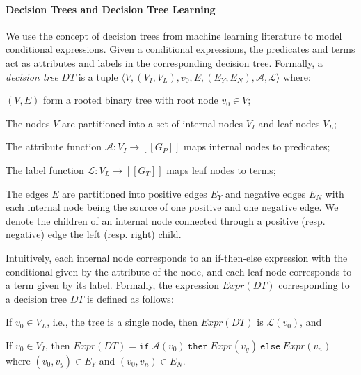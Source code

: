 \documentclass{llncs}
\newcommand\tuple[1]{\langle #1 \rangle}
\newcommand\Grammar{G}
\newcommand\sem[1]{[\![ #1 ]\!]}
\newcommand\ITE[3]{\mathtt{if}~#1~\mathtt{then}~#2~\mathtt{else}~#3}
\newcommand\DecisionTree{\mathit{DT}}
\newcommand\DTtoExpr[1]{\mathit{Expr}(#1)}
\newcommand\NodesInternal{V_I}
\newcommand\Nodes{V}
\newcommand\node{v}
\newcommand\NodesLeaf{V_L}
\newcommand\EdgesYes{E_Y}
\newcommand\EdgesNo{E_N}
\newcommand\Edges{E}
\newcommand\Attribute{\mathcal{A}}
\newcommand\Label{\mathcal{L}}
\begin{document}
\paragraph{Decision Trees and Decision Tree Learning}
We use the concept of decision trees from machine learning literature to
model conditional expressions.
Given a conditional expressions, the predicates and terms act as
attributes and labels in the corresponding decision tree.
Formally, a {\em decision tree} $\DecisionTree$  is a tuple $\tuple{
\Nodes, (\NodesInternal, \NodesLeaf), \node_0, \Edges, (\EdgesYes,
\EdgesNo), \Attribute, \Label }$ where:
\begin{inparaenum}[(a)]
\item $(\Nodes, \Edges)$ form a rooted binary tree with root node
    $\node_0 \in \Nodes$;
\item The nodes $\Nodes$ are partitioned into a set of internal nodes
    $\NodesInternal$ and leaf nodes $\NodesLeaf$;
\item The attribute function $\Attribute : \NodesInternal \to
    \sem{\Grammar_P}$ maps internal nodes to predicates;
\item The label function $\Label : \NodesLeaf \to \sem{\Grammar_T}$ maps
    leaf nodes to terms;
\item The edges $\Edges$ are partitioned into positive edges $\EdgesYes$
  and negative edges $\EdgesNo$ with each internal node being the source
  of one positive and one negative edge.
  We denote the children of an internal node connected through a
  positive (resp. negative) edge the left (resp. right) child.
\end{inparaenum}

Intuitively, each internal node corresponds to an if-then-else
expression with the conditional given by the attribute of the node, and
each leaf node corresponds to a term given by its label.
Formally, the expression $\DTtoExpr{\DecisionTree}$ corresponding to a
decision tree $\DecisionTree$ is defined as follows:
\begin{inparaenum}[(a)]
\item If $\node_0 \in \NodesLeaf$, i.e., the tree is a single node, then
    $\DTtoExpr{\DecisionTree}$ is $\Label(\node_0)$, and
\item If $\node_0 \in \NodesInternal$, then $\DTtoExpr{\DecisionTree} =
  \ITE{\Attribute(\node_0)}{\DTtoExpr{\node_y}}{\DTtoExpr{\node_n}}$
  where $(\node_0, \node_y) \in \EdgesYes$ and $(\node_0, \node_n) \in \EdgesNo$.
\end{inparaenum}
\end{document}
